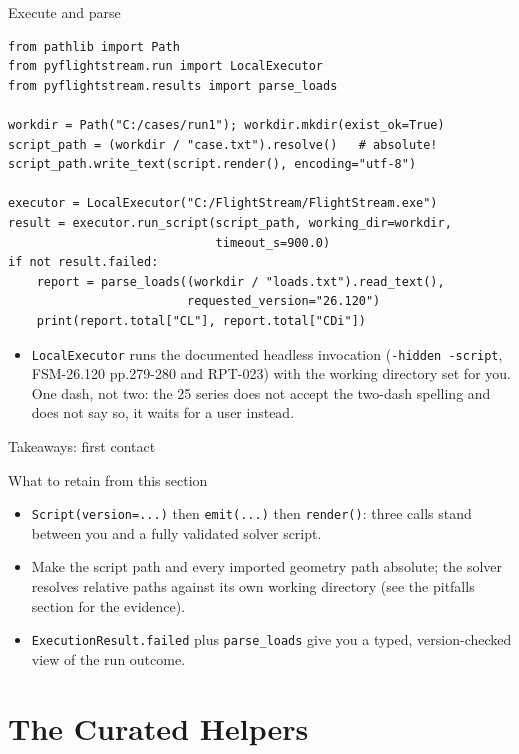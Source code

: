 \documentclass[aspectratio=169,10pt]{beamer}
\newcommand{\code}[1]{\texttt{\small #1}}
\begin{document}
\begin{frame}[fragile]{Execute and parse}
\begin{lstlisting}
from pathlib import Path
from pyflightstream.run import LocalExecutor
from pyflightstream.results import parse_loads

workdir = Path("C:/cases/run1"); workdir.mkdir(exist_ok=True)
script_path = (workdir / "case.txt").resolve()   # absolute!
script_path.write_text(script.render(), encoding="utf-8")

executor = LocalExecutor("C:/FlightStream/FlightStream.exe")
result = executor.run_script(script_path, working_dir=workdir,
                             timeout_s=900.0)
if not result.failed:
    report = parse_loads((workdir / "loads.txt").read_text(),
                         requested_version="26.120")
    print(report.total["CL"], report.total["CDi"])
\end{lstlisting}
  \begin{itemize}
    \item \code{LocalExecutor} runs the documented headless invocation (\code{-hidden -script}, FSM-26.120 pp.279-280 and RPT-023) with the working directory set for you. One dash, not two: the 25 series does not accept the two-dash spelling and does not say so, it waits for a user instead.
  \end{itemize}
\end{frame}

\begin{frame}{Takeaways: first contact}
  \begin{block}{What to retain from this section}
    \begin{itemize}
      \item \code{Script(version=...)} then \code{emit(...)} then \code{render()}: three calls stand between you and a fully validated solver script.
      \item Make the script path and every imported geometry path absolute; the solver resolves relative paths against its own working directory (see the pitfalls section for the evidence).
      \item \code{ExecutionResult.failed} plus \code{parse\_loads} give you a typed, version-checked view of the run outcome.
    \end{itemize}
  \end{block}
\end{frame}

\section{The Curated Helpers}
\end{document}

